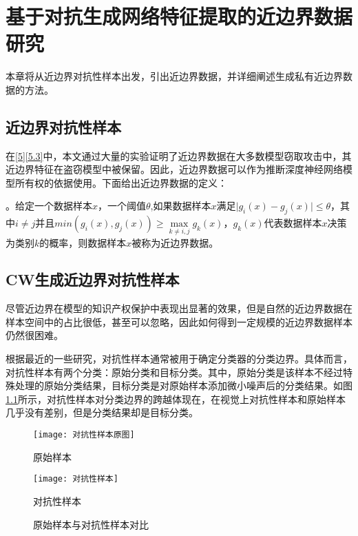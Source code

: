 
\chapter{基于对抗生成网络特征提取的近边界数据研究}\label{3}

本章将从近边界对抗性样本出发，引出近边界数据，并详细阐述生成私有近边界数据的方法。

\section{近边界对抗性样本}

在\ref{5}\ref{5.3}中，本文通过大量的实验证明了近边界数据在大多数模型窃取攻击中，其近边界特征在盗窃模型中被保留。因此，近边界数据可以作为推断深度神经网络模型所有权的依据使用。下面给出近边界数据的定义：

\begin{myDef}
	\label{def:1}
	。给定一个数据样本$x$，一个阈值$\theta$,如果数据样本$x$满足$\vert g_i(x) - g_j(x) \vert \leq \theta$，其中$i \neq j $并且$min(g_i(x), g_j(x)) \geq \mathop{max} \limits_{k \neq i, j}g_k(x)$，$g_k(x)$代表数据样本$x$决策为类别$k$的概率，则数据样本$x$被称为近边界数据。
\end{myDef}


\section{CW生成近边界对抗性样本}\label{3.2}

尽管近边界在模型的知识产权保护中表现出显著的效果，但是自然的近边界数据在样本空间中的占比很低，甚至可以忽略，因此如何得到一定规模的近边界数据样本仍然很困难。

根据最近的一些研究\cite{cao2021ipguard}，对抗性样本通常被用于确定分类器的分类边界。具体而言，对抗性样本有两个分类：原始分类和目标分类。其中，原始分类是该样本不经过特殊处理的原始分类结果，目标分类是对原始样本添加微小噪声后的分类结果。如图\ref{原始样本与对抗性样本对比}所示，对抗性样本对分类边界的跨越体现在，在视觉上对抗性样本和原始样本几乎没有差别，但是分类结果却是目标分类。

\begin{figure}[htbp]%
	\begin{minipage}[t]{0.5\linewidth}        %
		\hspace{2mm}
		\center
		\texttt{[image: 对抗性样本原图]}
		\centerline{原始样本}
	\end{minipage}
	\begin{minipage}[t]{0.5\linewidth}        %
		\hspace{2mm}
		\center
		\texttt{[image: 对抗性样本]}
		\centerline{对抗性样本}
	\end{minipage}
\setlength{\abovecaptionskip}{7mm} %
\caption{原始样本与对抗性样本对比}
\label{原始样本与对抗性样本对比}
\end {figure}

